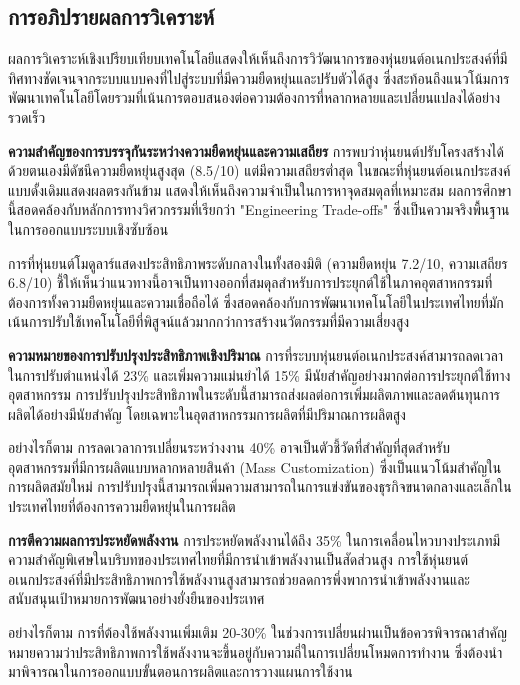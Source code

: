 \documentclass[a4paper]{article}
\begin{document}
\subsection{การอภิปรายผลการวิเคราะห์}

ผลการวิเคราะห์เชิงเปรียบเทียบเทคโนโลยีแสดงให้เห็นถึงการวิวัฒนาการของหุ่นยนต์อเนกประสงค์ที่มีทิศทางชัดเจนจากระบบแบบคงที่ไปสู่ระบบที่มีความยืดหยุ่นและปรับตัวได้สูง ซึ่งสะท้อนถึงแนวโน้มการพัฒนาเทคโนโลยีโดยรวมที่เน้นการตอบสนองต่อความต้องการที่หลากหลายและเปลี่ยนแปลงได้อย่างรวดเร็ว

\textbf{ความสำคัญของการบรรจุกันระหว่างความยืดหยุ่นและความเสถียร} การพบว่าหุ่นยนต์ปรับโครงสร้างได้ด้วยตนเองมีดัชนีความยืดหยุ่นสูงสุด (8.5/10) แต่มีความเสถียรต่ำสุด ในขณะที่หุ่นยนต์อเนกประสงค์แบบดั้งเดิมแสดงผลตรงกันข้าม แสดงให้เห็นถึงความจำเป็นในการหาจุดสมดุลที่เหมาะสม ผลการศึกษานี้สอดคล้องกับหลักการทางวิศวกรรมที่เรียกว่า "Engineering Trade-offs" ซึ่งเป็นความจริงพื้นฐานในการออกแบบระบบเชิงซับซ้อน

การที่หุ่นยนต์โมดูลาร์แสดงประสิทธิภาพระดับกลางในทั้งสองมิติ (ความยืดหยุ่น 7.2/10, ความเสถียร 6.8/10) ชี้ให้เห็นว่าแนวทางนี้อาจเป็นทางออกที่สมดุลสำหรับการประยุกต์ใช้ในภาคอุตสาหกรรมที่ต้องการทั้งความยืดหยุ่นและความเชื่อถือได้ ซึ่งสอดคล้องกับการพัฒนาเทคโนโลยีในประเทศไทยที่มักเน้นการปรับใช้เทคโนโลยีที่พิสูจน์แล้วมากกว่าการสร้างนวัตกรรมที่มีความเสี่ยงสูง

\textbf{ความหมายของการปรับปรุงประสิทธิภาพเชิงปริมาณ} การที่ระบบหุ่นยนต์อเนกประสงค์สามารถลดเวลาในการปรับตำแหน่งได้ 23\% และเพิ่มความแม่นยำได้ 15\% มีนัยสำคัญอย่างมากต่อการประยุกต์ใช้ทางอุตสาหกรรม การปรับปรุงประสิทธิภาพในระดับนี้สามารถส่งผลต่อการเพิ่มผลิตภาพและลดต้นทุนการผลิตได้อย่างมีนัยสำคัญ โดยเฉพาะในอุตสาหกรรมการผลิตที่มีปริมาณการผลิตสูง

อย่างไรก็ตาม การลดเวลาการเปลี่ยนระหว่างงาน 40\% อาจเป็นตัวชี้วัดที่สำคัญที่สุดสำหรับอุตสาหกรรมที่มีการผลิตแบบหลากหลายสินค้า (Mass Customization) ซึ่งเป็นแนวโน้มสำคัญในการผลิตสมัยใหม่ การปรับปรุงนี้สามารถเพิ่มความสามารถในการแข่งขันของธุรกิจขนาดกลางและเล็กในประเทศไทยที่ต้องการความยืดหยุ่นในการผลิต

\textbf{การตีความผลการประหยัดพลังงาน} การประหยัดพลังงานได้ถึง 35\% ในการเคลื่อนไหวบางประเภทมีความสำคัญพิเศษในบริบทของประเทศไทยที่มีการนำเข้าพลังงานเป็นสัดส่วนสูง การใช้หุ่นยนต์อเนกประสงค์ที่มีประสิทธิภาพการใช้พลังงานสูงสามารถช่วยลดการพึ่งพาการนำเข้าพลังงานและสนับสนุนเป้าหมายการพัฒนาอย่างยั่งยืนของประเทศ

อย่างไรก็ตาม การที่ต้องใช้พลังงานเพิ่มเติม 20-30\% ในช่วงการเปลี่ยนผ่านเป็นข้อควรพิจารณาสำคัญ หมายความว่าประสิทธิภาพการใช้พลังงานจะขึ้นอยู่กับความถี่ในการเปลี่ยนโหมดการทำงาน ซึ่งต้องนำมาพิจารณาในการออกแบบขั้นตอนการผลิตและการวางแผนการใช้งาน
\end{document}
